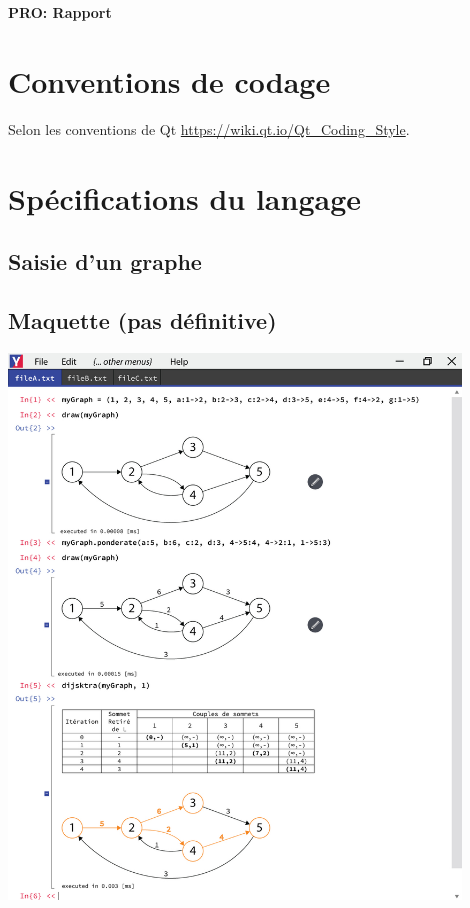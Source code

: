 \documentclass[french]{article}
\begin{document}
	\centering
	\large{\textbf{PRO: Rapport}}
	
	\justify
	
	\section{Conventions de codage}
		Selon les conventions de Qt \url{https://wiki.qt.io/Qt_Coding_Style}.
		
	\section{Spécifications du langage}
		\subsection{Saisie d'un graphe}
			
	
	
	
	
	
	
		
		\subsection{Maquette (pas définitive)}
			\includegraphics[width=0.9\textwidth]{maquette}
		
\end{document}
